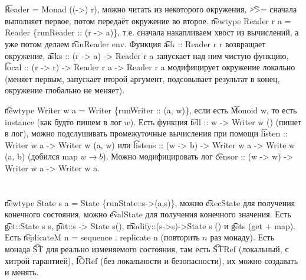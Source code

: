 \section{} %
\t{Reader = Monad ((->) r)}, можно читать из некоторого окружения, \t{>>=} сначала выполняет первое, потом передаёт окружение во второе.
\t{newtype Reader r a = Reader \{runReader :: (r -> a)\}}, т.е. сначала накапливаем хвост из вычислений, а уже потом
делаем \t{runReader env}.
Функция \t{ask :: Reader r r} возвращает окружение, \t{asks :: (r -> a) -> Reader r a} запускает над ним чистую функцию,
\t{local :: (r -> r) -> Reader r a -> Reader r a} модифицирует окружение локально (меняет первым, запускает второй аргумент, подсовывает
результат в конец, окружение глобально не меняет).

\t{newtype Writer w a = Writer \{runWriter :: (a, w)\}}, если есть \t{Monoid w}, то есть instance (как будто пишем в лог $w$).
Есть функция \t{tell :: w -> Writer w ()} (пишет в лог), можно подслушивать промежуточные вычисления при помощи
\t{listen :: Writer w a -> Writer w (a, w)} или \t{listens :: (w -> b) -> Writer w a -> Write w (a, b)} (добился map $w \to b$).
Можно модифицировать лог \t{censor :: (w -> w) -> Writer w a -> Writer w a}.

\section{} %
\t{newtype State s a = State \{runState::s->(a,s)\}}, можно \t{execState} для получения конечного состояния,
можно \t{evalState} для получения конечного значения.
Есть \t{get::State s s}, \t{put::s -> State s()}, \t{modify::(s->s)->State s ()} и \t{gets} (get + map).
Есть \t{replicateM n = sequence . replicate n} (повторить $n$ раз монаду).
Есть монада \t{ST} для реально изменяемого состояния, там есть \t{STRef} (локальный, с хитрой гарантией), \t{IORef} (без локальности и безопасности),
их можно создавать и менять.

\section{} %

\section{} %

\section{} %

\section{} %
